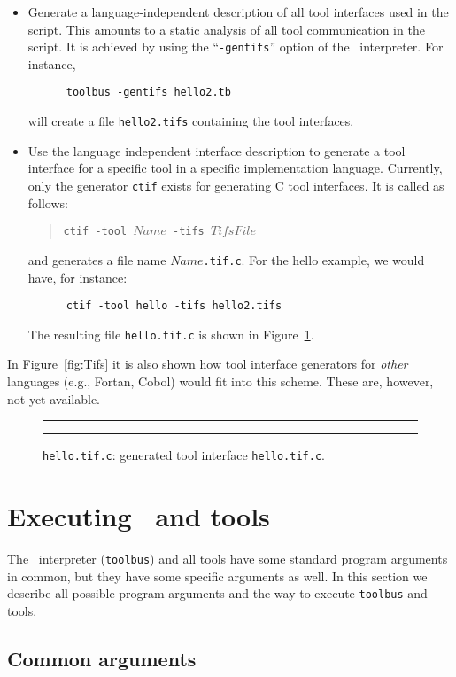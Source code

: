 \documentclass[a4,twoside,noweb]{article} %
\begin{document}
\begin{itemize}
\item Generate a language-independent
description of all tool interfaces used in the script.
This amounts to a static analysis of all tool communication
in the script. It is achieved by using the ``{\tt -gentifs}''
option of the \TB\ interpreter. For instance,
\begin{verbatim}
      toolbus -gentifs hello2.tb
\end{verbatim}
will create a file {\tt hello2.tifs} containing the tool interfaces.

\item Use the language independent interface description
to generate a tool interface for a specific tool in a specific
implementation language. Currently, only the generator {\tt ctif}
exists for generating C tool interfaces. It is called as follows:
\begin{quote}
      {\tt ctif -tool $Name$ -tifs $TifsFile$}
\end{quote}
and generates a file name $Name${\tt .tif.c}.
For the hello example, we would have, for instance:
\begin{verbatim}
      ctif -tool hello -tifs hello2.tifs
\end{verbatim}
The resulting file {\tt hello.tif.c} is shown in
Figure~\ref{fig:hello.tif.c}.
\end{itemize}

In Figure~\ref{fig:Tifs} it is also shown how tool interface generators
for {\em other} languages (e.g., Fortan, Cobol) would fit into this scheme.
These are, however, not yet available.

\begin{figure}
\rule{\textwidth}{0.5mm}

  \caption{{\tt hello.tif.c}: generated tool interface {\tt hello.tif.c}.}
  \label{fig:hello.tif.c}
\rule{\textwidth}{0.5mm}
\end{figure}

\section{\label{Executing}Executing \TB\ and tools}

The \TB\ interpreter ({\tt toolbus}) and all tools have some
standard program arguments in common, but they have some specific
arguments as well. In this section we describe all possible program arguments
and the way to execute {\tt toolbus} and tools.

\subsection{Common arguments}
\end{document}
